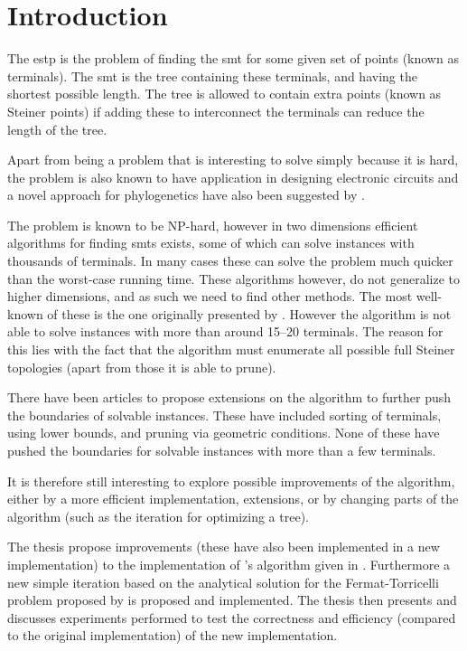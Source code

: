 { \abnormalparskip{0pt}
  \chapter{Introduction}
  \label{cha:introduction}
}

The \acl{estp} is the problem of finding the \acl{smt} for some given set of
points (known as terminals). The \acl{smt} is the tree containing these
terminals, and having the shortest possible length. The tree is allowed to
contain extra points (known as Steiner points) if adding these to interconnect
the terminals can reduce the length of the tree.

Apart from being a problem that is interesting to solve simply because it is
hard, the problem is also known to have application in designing electronic
circuits and a novel approach for phylogenetics have also been suggested by
\textcite{brazil2009}.

The problem is known to be NP-hard, however in two dimensions efficient
algorithms for finding \aclp{smt} exists, some of which can solve instances with
thousands of terminals. In many cases these can solve the problem much quicker
than the worst-case running time. These algorithms however, do not generalize to
higher dimensions, and as such we need to find other methods. The most
well-known of these is the one originally presented by \textcite{smith1992}.
However the algorithm is not able to solve instances with more than around
15--20 terminals. The reason for this lies with the fact that the algorithm
must enumerate all possible full Steiner topologies (apart from those it is able
to prune).

There have been articles to propose extensions on the algorithm to further push
the boundaries of solvable instances. These have included sorting of terminals,
using lower bounds, and pruning via geometric conditions. None of these have
pushed the boundaries for solvable instances with more than a few terminals.

It is therefore still interesting to explore possible improvements of the
algorithm, either by a more efficient implementation, extensions, or by changing
parts of the algorithm (such as the iteration for optimizing a tree).

The thesis propose improvements (these have also been implemented in a
new implementation) to the implementation of \citeauthor{smith1992}'s algorithm
given in \textcite{smith1992}. Furthermore a new simple iteration based on the
analytical solution for the Fermat-Torricelli problem proposed by
\textcite{uteshev2014} is proposed and implemented. The thesis then presents and
discusses experiments performed to test the correctness and efficiency (compared
to the original implementation) of the new implementation.

